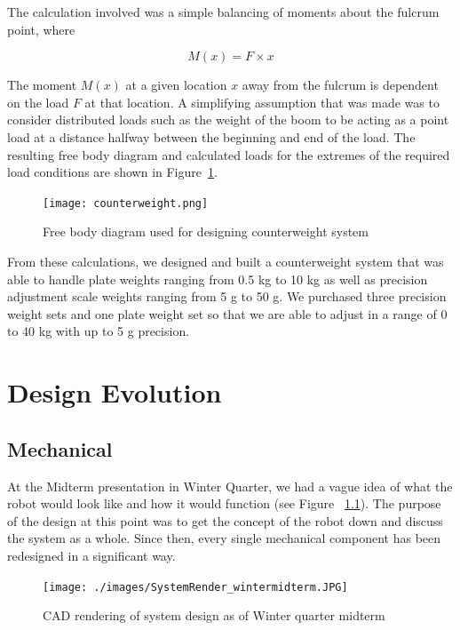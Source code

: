 \documentclass{report}
\begin{document}
The calculation involved was a simple balancing of moments about the fulcrum point, where

\begin{equation}
M(x) = F\times x
\end{equation}

The moment $M(x)$ at a given location $x$ away from the fulcrum is dependent on the load $F$ at that location. A simplifying assumption that was made was to consider distributed loads such as the weight of the boom to be acting as a point load at a distance halfway between the beginning and end of the load. The resulting free body diagram and calculated loads for the extremes of the required load conditions are shown in Figure~\ref{fig:counterweight}.

\begin{figure}[H]
\centering
\texttt{[image: counterweight.png]}
\caption[Free body diagram used for designing counterweight system]{Free body diagram used for designing counterweight system}
\label{fig:counterweight}
\end{figure}

From these calculations, we designed and built a counterweight system that was able to handle plate weights ranging from 0.5 kg to 10 kg as well as precision adjustment scale weights ranging from 5 g to 50 g. We purchased three precision weight sets and one plate weight set so that we are able to adjust in a range of 0 to 40 kg with up to 5 g precision.

\chapter[Design Evolution]{Design Evolution}
\section[Mechanical]{Mechanical}
At the Midterm presentation in Winter Quarter, we had a vague idea of what the robot would look like and how it would function (see Figure~ \ref{fig:systemrender_WM}). The purpose of the design at this point was to get the concept of the robot down and discuss the system as a whole. Since then, every single mechanical component has been redesigned in a significant way.

\begin{figure}[H]
\centering
\texttt{[image: ./images/SystemRender\_wintermidterm.JPG]}
\caption[CAD rendering of system design as of Winter quarter midterm]{CAD rendering of system design as of Winter quarter midterm}
\label{fig:systemrender_WM}
\end{figure}
\end{document}

